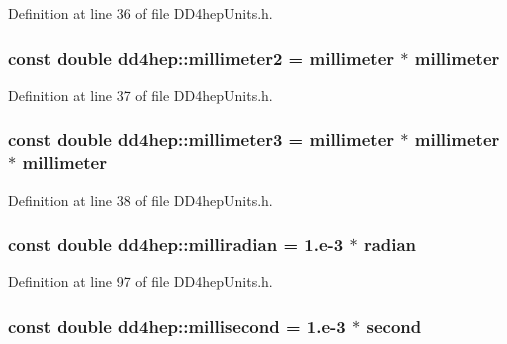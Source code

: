 Definition at line 36 of file DD4hepUnits.h.\hypertarget{namespacedd4hep_a1096fbca749064ac09ed44d5a2b37599}{
\subsubsection[{millimeter2}]{\setlength{\rightskip}{0pt plus 5cm}const double {\bf dd4hep::millimeter2} = {\bf millimeter} $\ast$ {\bf millimeter}}}
\label{namespacedd4hep_a1096fbca749064ac09ed44d5a2b37599}


Definition at line 37 of file DD4hepUnits.h.\hypertarget{namespacedd4hep_a2ea09df717c3b153b6ea78fbd517fddc}{
\subsubsection[{millimeter3}]{\setlength{\rightskip}{0pt plus 5cm}const double {\bf dd4hep::millimeter3} = {\bf millimeter} $\ast$ {\bf millimeter} $\ast$ {\bf millimeter}}}
\label{namespacedd4hep_a2ea09df717c3b153b6ea78fbd517fddc}


Definition at line 38 of file DD4hepUnits.h.\hypertarget{namespacedd4hep_a7502a4a65dcbf4395be335d0ba214a82}{
\subsubsection[{milliradian}]{\setlength{\rightskip}{0pt plus 5cm}const double {\bf dd4hep::milliradian} = 1.e-\/3 $\ast$ {\bf radian}}}
\label{namespacedd4hep_a7502a4a65dcbf4395be335d0ba214a82}


Definition at line 97 of file DD4hepUnits.h.\hypertarget{namespacedd4hep_ac5b763830694c4ae41e03dc174f1cc79}{
\subsubsection[{millisecond}]{\setlength{\rightskip}{0pt plus 5cm}const double {\bf dd4hep::millisecond} = 1.e-\/3 $\ast$ {\bf second}}}
\label{namespacedd4hep_ac5b763830694c4ae41e03dc174f1cc79}


